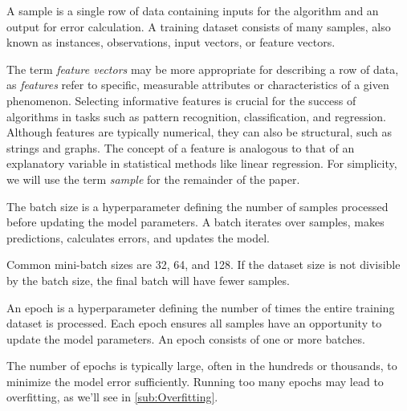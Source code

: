 \documentclass{article}
\begin{document}
\begin{definition}[Sample]
  A sample is a single row of data containing inputs for the algorithm and an output for error calculation. A training dataset consists of many samples, also known as instances, observations, input vectors, or feature vectors.
\end{definition}

The term \textit{feature vectors} may be more appropriate for describing a row of data, as \textit{features} refer to specific, measurable attributes or characteristics of a given phenomenon. Selecting informative features is crucial for the success of algorithms in tasks such as pattern recognition, classification, and regression. Although features are typically numerical, they can also be structural, such as strings and graphs. The concept of a feature is analogous to that of an explanatory variable in statistical methods like linear regression. For simplicity, we will use the term \textit{sample} for the remainder of the paper.

\begin{definition}[Batch]
  The batch size is a hyperparameter defining the number of samples processed before updating the model parameters. A batch iterates over samples, makes predictions, calculates errors, and updates the model. 
\end{definition}

Common mini-batch sizes are 32, 64, and 128. If the dataset size is not divisible by the batch size, the final batch will have fewer samples.
\begin{definition}[Epoch]
  An epoch is a hyperparameter defining the number of times the entire training dataset is processed. Each epoch ensures all samples have an opportunity to update the model parameters. An epoch consists of one or more batches.
\end{definition}
   The number of epochs is typically large, often in the hundreds or thousands, to minimize the model error sufficiently. Running too many epochs may lead to overfitting, as we'll see in \autoref{sub:Overfitting}.
\end{document}
